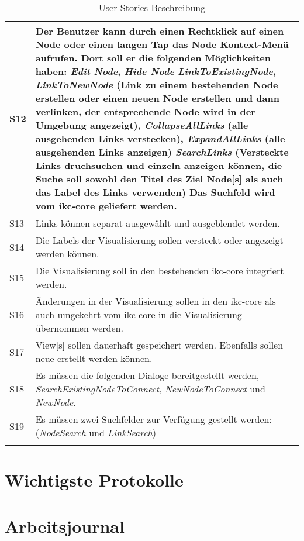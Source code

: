 \begin{longtable}{|p{1cm} | p{10.8cm} |}
S12 & Der Benutzer kann durch einen Rechtklick auf einen \gls{Node} oder einen langen Tap das \gls{Node} Kontext-Menü aufrufen. Dort soll er die folgenden Möglichkeiten haben: \textit{Edit Node}, \textit{Hide Node} \textit{LinkToExistingNode}, \textit{LinkToNewNode} (Link zu einem bestehenden \gls{Node} erstellen oder einen neuen \gls{Node} erstellen und dann verlinken, der entsprechende \gls{Node} wird in der Umgebung angezeigt), \textit{CollapseAllLinks} (alle ausgehenden Links verstecken), \textit{ExpandAllLinks} (alle ausgehenden Links anzeigen) \textit{SearchLinks} (Versteckte Links druchsuchen und einzeln anzeigen können, die Suche soll sowohl den Titel des Ziel \gls{Node}[s] als auch das Label des Links verwenden) Das Suchfeld wird vom \gls{ikc-core} geliefert werden. \\ \hline
S13 & Links können separat ausgewählt und ausgeblendet werden.  \\ \hline
S14 & Die Labels der Visualisierung sollen versteckt oder angezeigt werden können.\\ \hline
S15 & Die Visualisierung soll in den bestehenden \gls{ikc-core} integriert werden. \\ \hline
S16 & Änderungen in der Visualisierung sollen in den \gls{ikc-core} als auch umgekehrt vom \gls{ikc-core} in die Visualisierung übernommen werden. \\ \hline
S17 & \gls{View}[s] sollen dauerhaft gespeichert werden. Ebenfalls sollen neue erstellt werden können.          \\ \hline
S18 & Es müssen die folgenden Dialoge bereitgestellt werden, \textit{SearchExistingNodeToConnect}, \textit{NewNodeToConnect} und \textit{NewNode}.\\ \hline
S19 & Es müssen zwei Suchfelder zur Verfügung gestellt werden: (\textit{NodeSearch} und \textit{LinkSearch})\\ \hline
    \caption{User Stories Beschreibung}
\label{user-stories-desc}
\end{longtable}

\section{Wichtigste Protokolle}







\section{Arbeitsjournal}
